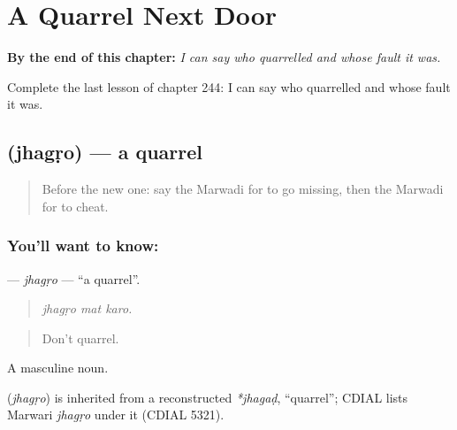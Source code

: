 
\chapter{A Quarrel Next Door}
\label{ch:mw-a-quarrel-next-door}

\begin{chapteropening}
\textbf{By the end of this chapter:} \emph{I can say who quarrelled and whose fault it was.}

Complete the last lesson of chapter 244: I can say who quarrelled and whose fault it was.
\end{chapteropening}

\section[\texorpdfstring{\mw{झगड़ो} (jhagṛo)}{झगड़ो (jhagṛo)}]{ (jhagṛo) — a quarrel}

\label{lesson:MW-C244-jhagro}



\begin{quote}
Before the new one: say the Marwadi for to go missing, then the Marwadi for to cheat.
\end{quote}

\subsection*{You'll want to know: }
\textbf{} — \emph{jhagṛo} — \textquotedblleft{}a quarrel\textquotedblright{}.

\begin{quote}
  
\end{quote}

\begin{quote}
\emph{jhagṛo mat karo.}
\end{quote}

\begin{quote}
Don't quarrel.
\end{quote}

A masculine noun.

\begin{cousinweb}
\textbf{} (\emph{jhagṛo}) is inherited from a reconstructed \emph{*jhagaḍ}, \textquotedblleft{}quarrel\textquotedblright{}; CDIAL lists Marwari \emph{jhagṛo} under it (CDIAL 5321).
\end{cousinweb}

